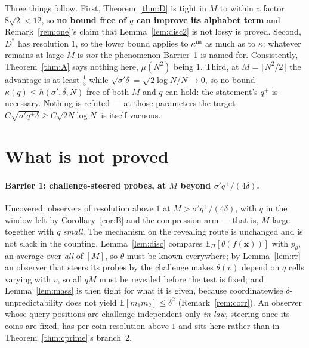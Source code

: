 \documentclass{aicr-solution}
\newcommand{\Exp}{\mathbb{E}}
\newcommand{\vx}{\mathbf{x}}
\newcommand{\kna}{\kappa^{\mathrm{na}}}
\begin{document}
Three things follow. First, Theorem~\ref{thm:D} is tight in $M$ to within a factor
$8\sqrt2<12$, so \textbf{no bound free of $q$ can improve its alphabet term} and
Remark~\ref{rem:one}'s claim that Lemma~\ref{lem:disc2} is not lossy is proved.
Second, $D^{*}$ has resolution $1$, so the lower bound applies to $\kna$ as much as
to $\kappa$: whatever remains at large $M$ is \emph{not} the phenomenon Barrier~1
is named for. Consistently, Theorem~\ref{thm:A} says nothing here, $\mu(N^{2})$
being $1$. Third, at $M=\lfloor N^{2}/2\rfloor$ the advantage is at least
$\tfrac18$ while $\sqrt{\sigma'\delta}=\sqrt{2\log N/N}\to0$, so no bound
$\kappa(q)\le h(\sigma',\delta,N)$ free of both $M$ and $q$ can hold: the
statement's $q^{+}$ is necessary. Nothing is refuted --- at those parameters the
target $C\sqrt{\sigma'q^{+}\delta}\ge C\sqrt{2N\log N}$ is itself vacuous.

\section{What is not proved}\label{sec:barriers}

\paragraph{Barrier 1: challenge-steered probes, at $M$ beyond
$\sigma'q^{+}/(4\delta)$.} Uncovered: observers of resolution above $1$ at
$M>\sigma'q^{+}/(4\delta)$, with $q$ in the window left by Corollary~\ref{cor:B}
and the compression arm --- that is, $M$ large together with $q$ \emph{small}. The
mechanism on the revealing route is unchanged and is not slack in the counting.
Lemma~\ref{lem:disc} compares $\Exp_\Pi[\theta(f(\vx))]$ with $p_\theta$, an
average over \emph{all} of $[M]$, so $\theta$ must be known everywhere; by
Lemma~\ref{lem:rr} an observer that steers its probes by the challenge makes
$\theta(v)$ depend on $q$ cells varying with $v$, so all $qM$ must be revealed
before the test is fixed; and Lemma~\ref{lem:mass} is then tight for what it is
given, because coordinatewise $\delta$-unpredictability does not yield
$\Exp[m_1m_2]\le\delta^{2}$ (Remark~\ref{rem:corr}). An observer whose query
positions are challenge-independent only \emph{in law}, steering once its coins are
fixed, has per-coin resolution above $1$ and sits here rather than in
Theorem~\ref{thm:cprime}'s branch~2.
\end{document}
